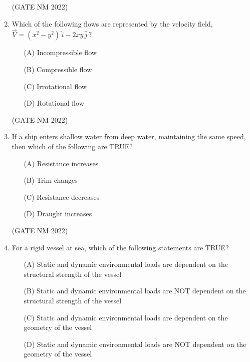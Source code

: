 \documentclass[journal,12pt,onecolumn]{IEEEtran}
\theoremstyle{remark}
\begin{document}
\begin{enumerate}
\hfill(GATE NM 2022)







\item  Which of the following flows are represented by the velocity field,  
$
\vec{V} = (x^2 - y^2)\,\hat{i} - 2xy\,\hat{j} \, ?
$

\begin{multicols}{2}

\begin{enumerate}
    \item[(A)] Incompressible flow
    \item[(B)] Compressible flow
    \item[(C)] Irrotational flow
    \item[(D)] Rotational flow
\end{enumerate}

\end{multicols}

\hfill(GATE NM 2022)




\item  If a ship enters shallow water from deep water, maintaining the same speed, then which of the following are TRUE?

	\begin{multicols}{2}

\begin{enumerate}
    \item[(A)] Resistance increases
    \item[(B)] Trim changes
    \item[(C)] Resistance decreases
    \item[(D)] Draught increases
\end{enumerate}

	\end{multicols}

\hfill(GATE NM 2022)






\item  For a rigid vessel at sea, which of the following statements are TRUE?

\begin{enumerate}
    \item[(A)] Static and dynamic environmental loads are dependent on the structural strength of the vessel
    \item[(B)] Static and dynamic environmental loads are NOT dependent on the structural strength of the vessel
    \item[(C)] Static and dynamic environmental loads are dependent on the geometry of the vessel
    \item[(D)] Static and dynamic environmental loads are NOT dependent on the geometry of the vessel
\end{enumerate}


\end{enumerate}
\end{document}
